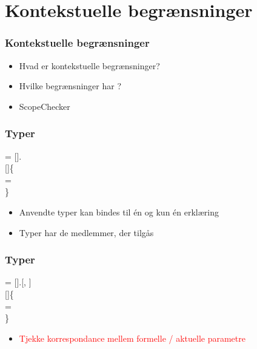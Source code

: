 \section{Kontekstuelle begrænsninger}

\begin{frame}
\frametitle{Kontekstuelle begrænsninger}
\begin{center}
\begin{itemize}
\item Hvad er kontekstuelle begrænsninger?
\item Hvilke begrænsninger har \productname{}?
\item ScopeChecker
\end{itemize}
\end{center}
\end{frame}


\begin{frame}[fragile]
\frametitle{Typer}

  = []. \\
 []\{ \\
  \quad  {}  =  \\
\}

\begin{itemize}                                  
\item Anvendte typer kan bindes til én og kun én erklæring
\item Typer har de medlemmer, der tilgås
\end{itemize}
\end{frame}

\begin{frame}[fragile]

\end{frame}

\begin{frame}[fragile]
\frametitle{Typer}

  = [].[,
] \\
 []\{ \\
  \quad  {}  =  \\
\}

\begin{itemize}                                  
\item \textcolor{red}{Tjekke korrespondance mellem formelle / aktuelle parametre}
\end{itemize}

\end{frame}

